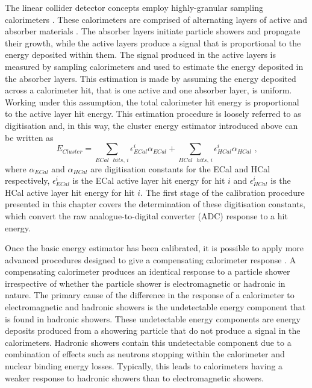 The linear collider detector concepts employ highly-granular sampling calorimeters \cite{Behnke:2013lya,Linssen:2012hp}.  These calorimeters are comprised of alternating layers of active and absorber materials \cite{Fabjan:2003aq}.  The absorber layers initiate particle showers and propagate their growth, while the active layers produce a signal that is proportional to the energy deposited within them.  The signal produced in the active layers is measured by sampling calorimeters and used to estimate the energy deposited in the absorber layers.  This estimation is made by assuming the energy deposited across a calorimeter hit, that is one active and one absorber layer, is uniform.  Working under this assumption, the total calorimeter hit energy is proportional to the active layer hit energy.  This estimation procedure is loosely referred to as digitisation and, in this way, the cluster energy estimator introduced above can be written as
%
\begin{equation}
E_{Cluster} = \sum_{ECal \text{ } hits \text{, }i} \epsilon^{i}_{ECal} \alpha_{ECal} + \sum_{HCal \text{ } hits \text{, }i} \epsilon^{i}_{HCal} \alpha_{HCal} \text{ ,}
\end{equation}
%
\noindent where $\alpha_{ECal}$ and $\alpha_{HCal}$ are digitisation constants for the ECal and HCal respectively, $\epsilon^{i}_{ECal}$ is the ECal active layer hit energy for hit $i$ and $\epsilon^{i}_{HCal}$ is the HCal active layer hit energy for hit $i$.  The first stage of the calibration procedure presented in this chapter covers the determination of these digitisation constants, which convert the raw analogue-to-digital converter (ADC) response to a hit energy.

Once the basic energy estimator has been calibrated, it is possible to apply more advanced procedures designed to give a compensating calorimeter response \cite{arXiv:0907.3577}.  A compensating calorimeter produces an identical response to a particle shower irrespective of whether the particle shower is electromagnetic or hadronic in nature.  The primary cause of the difference in the response of a calorimeter to electromagnetic and hadronic showers is the undetectable energy component that is found in hadronic showers.  These undetectable energy components are energy deposits produced from a showering particle that do not produce a signal in the calorimeters.  Hadronic showers contain this undetectable component due to a combination of effects such as neutrons stopping within the calorimeter and nuclear binding energy losses.  Typically, this leads to calorimeters having a weaker response to hadronic showers than to electromagnetic showers.  

